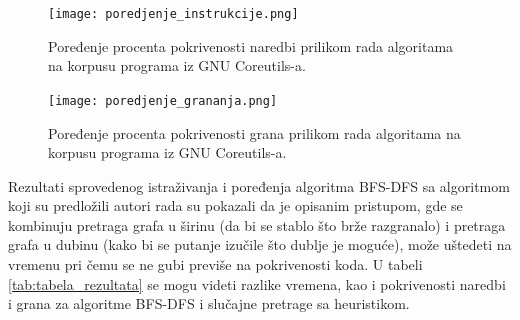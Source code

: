 \documentclass[12pt,oneside]{memoir}
\begin{document}
\begin{figure}[H]
    \centering
    \texttt{[image: poredjenje\_instrukcije.png]}
    \caption{Poređenje procenta pokrivenosti naredbi prilikom rada algoritama na korpusu programa iz GNU Coreutils-a.}
    \label{fig:poredjenje_instrukcija}
\end{figure}

\begin{figure}[H]
    \centering
    \texttt{[image: poredjenje\_grananja.png]}
    \caption{Poređenje procenta pokrivenosti grana prilikom rada algoritama na korpusu programa iz GNU Coreutils-a.}
    \label{fig:poredjenje_grana}
\end{figure}

\newpage
Rezultati sprovedenog istraživanja i poređenja algoritma BFS-DFS sa algoritmom koji su predložili autori rada su pokazali da je opisanim pristupom, gde se kombinuju pretraga grafa u širinu (da bi se stablo što brže razgranalo) i pretraga grafa u dubinu (kako bi se putanje izučile što dublje je moguće), može uštedeti na vremenu pri čemu se ne gubi previše na pokrivenosti koda. U tabeli \ref{tab:tabela_rezultata} se mogu videti razlike vremena, kao i pokrivenosti naredbi i grana za algoritme BFS-DFS i slučajne pretrage sa heuristikom.
\end{document}
